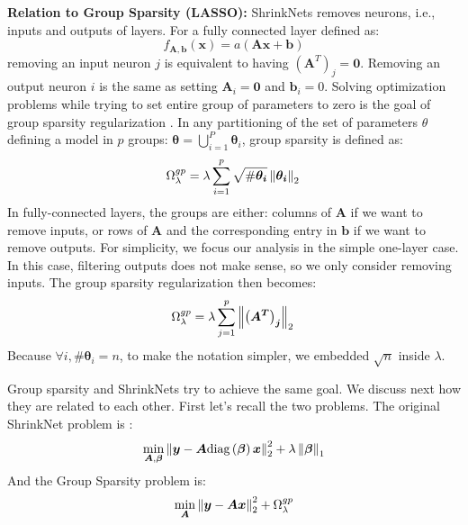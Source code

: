 \noindent\textbf{Relation to Group Sparsity (LASSO): } ShrinkNets removes neurons,
i.e., inputs and outputs of layers. For a fully connected layer defined as:
%
\begin{equation} \label{fully_connected}
  f_{\bm{A}, \bm{b}}(\bm{x})=a(\bm{Ax + b})
\end{equation}
%
removing an input neuron $j$ is equivalent to having $\left(\bm{A}^T\right)_j =
\bm{0}$. Removing an output neuron $i$ is the same as setting $\bm{A}_i = \bm{0}$
and $\bm{b}_i = 0$. Solving optimization problems while trying to set entire
group of parameters to zero is the goal of group sparsity regularization
\cite{xxx}. In  any partitioning of the set of parameters $\theta$ defining a model in $p$
groups: $\bm{\theta} = \bigcup_{i=1}^P \bm{\theta}_i$, group sparsity is defined as: 
%
\begin{equation}
  \Omega_\lambda^{gp} = \lambda \sum_{i=1}^p \sqrt{\#\bm{\theta_i}} \left\lVert\bm{\theta_i}\right\rVert_2 \\
\end{equation}
%
In fully-connected layers, the groups are either: columns of
$\bm{A}$ if we want to remove inputs, or rows of $\bm{A}$ and the corresponding
entry in $\bm{b}$ if we want to remove outputs. For simplicity, we focus
our analysis in the simple one-layer case. In this case, filtering outputs does
not make sense, so we only consider removing inputs. The
group sparsity regularization then becomes:
%
\begin{equation} \label{group_sparsity_regularization}
  \Omega_\lambda^{gp} = \lambda \sum_{j=1}^p \left\lVert\bm{\left(A^T\right)_j}\right\rVert_2 \\
\end{equation}
%
Because $\forall i, \#\bm{\theta}_i = n$, to make the notation simpler, we
embedded $\sqrt{n}$ inside $\lambda$.

Group sparsity and ShrinkNets try to achieve the same goal. We discuss next how
they are related to each other. First let's recall the two problems. The
original ShrinkNet problem is :
%
\begin{equation}
  \min_{\bm{A}, \bm{\beta}} \left\lVert\bm{y} - \bm{A}\text{diag}\left(\bm{\beta}\right)\bm{x}\right\rVert_2^2 + \lambda \left\lVert\bm{\beta}\right\rVert_1
\end{equation}
%
And the Group Sparsity problem is:
%
\begin{equation}
  \min_{\bm{A}} \left\lVert\bm{y} - \bm{A}\bm{x}\right\rVert_2^2 + \Omega_\lambda^{gp}
\end{equation}
%


